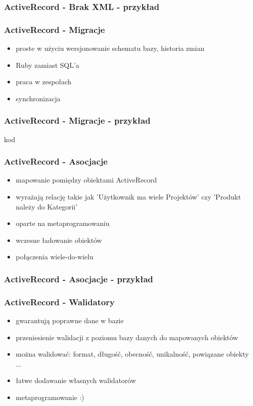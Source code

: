 \documentclass[12t]{beamer}
\begin{document}
\begin{frame}
  \frametitle{ActiveRecord - Brak XML - przykład}

\end{frame}

\begin{frame}
  \frametitle{ActiveRecord - Migracje}
  \begin{itemize}
  \item proste w użyciu wersjonowanie schematu bazy, historia zmian
  \item Ruby zamiast SQL'a
  \item praca w zespołach
  \item synchronizacja
  \end{itemize}
\end{frame}

\begin{frame}
  \frametitle{ActiveRecord - Migracje - przykład}
  kod
\end{frame}

\begin{frame}
  \frametitle{ActiveRecord - Asocjacje}
  \begin{itemize}
  \item mapowanie pomiędzy obiektami ActiveRecord
  \item wyrażają relację takie jak 'Użytkownik ma wiele Projektów' czy 'Produkt należy do Kategorii'
  \item oparte na metaprogramowaniu
  \item wczesne ładowanie obiektów
  \item połączenia wiele-do-wielu
  \end{itemize}
\end{frame}

\begin{frame}
  \frametitle{ActiveRecord - Asocjacje - przykład}
\end{frame}

\begin{frame}
  \frametitle{ActiveRecord - Walidatory}
  \begin{itemize}
  \item gwarantują poprawne dane w bazie
  \item przeniesienie walidacji z poziomu bazy danych do mapowanych obiektów
  \item można walidować: format, długość, obecność, unikalność, powiązane obiekty ...
  \item łatwe dodawanie własnych walidatorów
  \item metaprogramowanie :)
  \end{itemize}
\end{frame}
\end{document}
